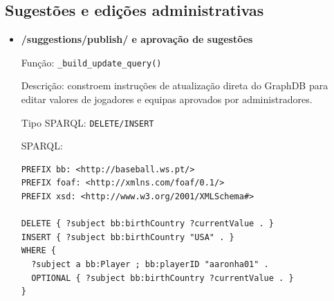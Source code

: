 \subsection{Sugest\~oes e edi\c{c}\~oes administrativas}

\begin{itemize}[leftmargin=*]
  \item \textbf{/suggestions/publish/ e aprova\c{c}\~ao de sugest\~oes}
  
  Fun\c{c}\~ao: \texttt{\_build\_update\_query()}
  
  Descri\c{c}\~ao: constroem instru\c{c}\~oes de atualiza\c{c}\~ao direta do GraphDB para editar valores de jogadores e equipas aprovados por administradores.
  
  Tipo SPARQL: \texttt{DELETE/INSERT}

  SPARQL:

\begin{Verbatim}[fontsize=\scriptsize,breaklines=true]
PREFIX bb: <http://baseball.ws.pt/>
PREFIX foaf: <http://xmlns.com/foaf/0.1/>
PREFIX xsd: <http://www.w3.org/2001/XMLSchema#>

DELETE { ?subject bb:birthCountry ?currentValue . }
INSERT { ?subject bb:birthCountry "USA" . }
WHERE {
  ?subject a bb:Player ; bb:playerID "aaronha01" .
  OPTIONAL { ?subject bb:birthCountry ?currentValue . }
}
\end{Verbatim}
\end{itemize}
